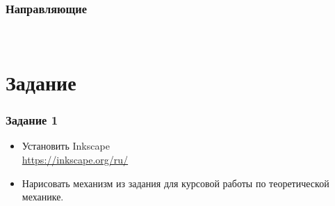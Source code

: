 \documentclass[12pt, compress]{beamer}
\begin{document}
\begin{frame}
\frametitle{Направляющие }
\begin{center}
 \\
\end{center}
\end{frame}




\section{Задание}

\begin{frame}
\frametitle{Задание 1}
\begin{itemize}
  \item Установить Inkscape \\
  \url{https://inkscape.org/ru/}
  \item Нарисовать механизм из задания для курсовой работы по теоретической механике.
\end{itemize}
\end{frame}
\end{document}
